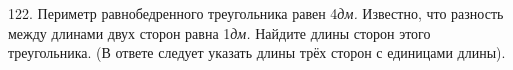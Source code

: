 122. Периметр равнобедренного треугольника равен 4{\it дм.} Известно, что разность между длинами двух сторон равна 1{\it дм.} Найдите длины сторон этого треугольника. (В ответе следует указать длины трёх сторон с единицами длины).\\
